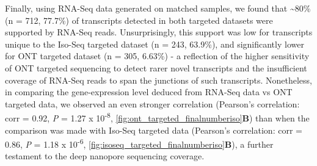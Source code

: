 Finally, using RNA-Seq data generated on matched samples, we found that \textasciitilde80\% (n = 712, 77.7\%) of transcripts detected in both targeted datasets were supported by RNA-Seq reads. Unsurprisingly, this support was low for transcripts unique to the Iso-Seq targeted dataset (n = 243, 63.9\%), and significantly lower for ONT targeted dataset (n = 305, 6.63\%) - a reflection of the higher sensitivity of ONT targeted sequencing to detect rarer novel transcripts and the insufficient coverage of RNA-Seq reads to span the junctions of such transcripts. Nonetheless, in comparing the gene-expression level deduced from RNA-Seq data vs ONT targeted data, we observed an even stronger correlation (Pearson's correlation: corr = 0.92, \textit{P} = 1.27 x 10\textsuperscript{-8}, \cref{fig:ont_targeted_finalnumberiso}\textbf{B}) than when the comparison was made with Iso-Seq targeted data (Pearson's correlation: corr = 0.86, \textit{P} = 1.18 x 10\textsuperscript{-6}, \cref{fig:isoseq_targeted_finalnumberiso}\textbf{B}), a further testament to the deep nanopore sequencing coverage.  


